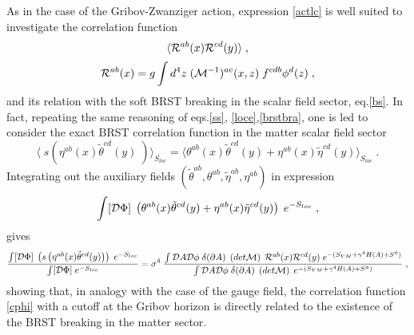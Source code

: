 As in the case of the Gribov-Zwanziger action, expression
\eqref{actlc} is well suited to investigate the correlation function 
\begin{equation} 
 \langle {\cal R}^{ab}(x)  {\cal R}^{cd}(y)  \rangle    \;, \label{cphi} 
\end{equation} 
\begin{equation}
{\cal R}^{ab}(x)  =  g \int d^4z\;  ({\cal M}^{-1})^{ac} (x,z)   \; f^{cdb} \phi^{d}(z)   \label{rmsc}  \;, 
\end{equation}
and its relation with the soft BRST breaking in the scalar field sector, eq.\eqref{bs}. In fact, repeating the same reasoning of eqs.\eqref{ss}, \eqref{loce},\eqref{brstbra}, one is led to consider the exact BRST correlation function in the matter scalar field sector
\begin{equation} 
\langle \; s ( \eta^{ab}(x) {\tilde \theta}^{cd}(y)  \; ) \rangle_{S_{ loc}}  = \langle   \theta^{ab}(x) {\tilde \theta}^{cd}(y) + \eta^{ab}(x) {\tilde \eta}^{cd}(y)      \rangle_{S_{ loc}} \;.
\end{equation}
Integrating out the auxiliary fields $(\tilde{\theta}^{ab}, \theta^{ab}, \tilde{\eta}^{ab},\eta^{ab})$ in expression 
\begin{equation}
\int [{\cal D} {\Phi}] \; \left( \theta^{ab}(x) {\tilde \theta}^{cd}(y) + \eta^{ab}(x) {\tilde \eta}^{cd}(y) \right)   \; e^{-S_{loc}} \;,  \label{locphi}
\end{equation}
gives
\begin{equation} 
\frac{ \int [{\cal D} {\Phi}] \;   \left( s \left( \eta^{ab}(x) {\tilde \theta}^{cd}(y)
\right)   \right) \; e^{-S_{loc}} }{ \int [{\cal D} {\Phi}]    \; e^{-S_{loc}}}  =\sigma^4 \;
\frac{  \int {\cal D}A {\cal D}{\phi}\; \delta(\partial A) \; \left( det{\cal M} \right) \;
{\cal R}^{ab}(x)  {\cal R}^{cd}(y)  \; e^{-(S_{YM}+\gamma^4 H(A) + S^{\phi})} } {\int {\cal D}A
{\cal D}{\phi} \; \delta(\partial A) \; \left( det{\cal M} \right)   \; e^{-(S_{YM}+\gamma^4
H(A) + S^{\phi})}  } \;,\label{brstphi}
\end{equation}
showing that, in analogy with the case of the gauge field,  the correlation function \eqref{cphi}  with a cutoff at the Gribov horizon is directly related to the existence of the BRST breaking in the matter sector. 

